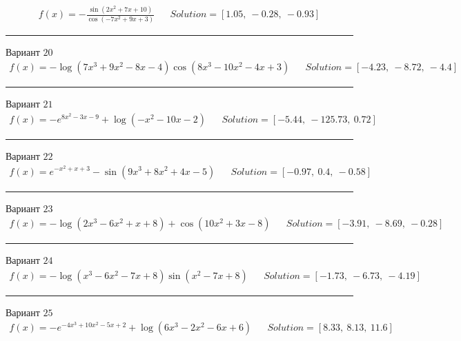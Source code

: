 \documentclass[11pt]{report}
\begin{document}
\begin{align*}
    f(x) = - \frac{\sin{\left(2 x^{2} + 7 x + 10 \right)}}{\cos{\left(- 7 x^{2} + 9 x + 3 \right)}} && Solution = \left[ 1.05, \  -0.28, \  -0.93\right]
\end{align*}
\begin{center}
    \noindent\rule{8cm}{0.4pt}
\end{center}
Вариант \(20\)
\begin{align*}
    f(x) = - \log{\left(7 x^{3} + 9 x^{2} - 8 x - 4 \right)} \cos{\left(8 x^{3} - 10 x^{2} - 4 x + 3 \right)} && Solution = \left[ -4.23, \  -8.72, \  -4.4\right]
\end{align*}
\begin{center}
    \noindent\rule{8cm}{0.4pt}
\end{center}
Вариант \(21\)
\begin{align*}
    f(x) = - e^{8 x^{2} - 3 x - 9} + \log{\left(- x^{2} - 10 x - 2 \right)} && Solution = \left[ -5.44, \  -125.73, \  0.72\right]
\end{align*}
\begin{center}
    \noindent\rule{8cm}{0.4pt}
\end{center}
Вариант \(22\)
\begin{align*}
    f(x) = e^{- x^{2} + x + 3} - \sin{\left(9 x^{3} + 8 x^{2} + 4 x - 5 \right)} && Solution = \left[ -0.97, \  0.4, \  -0.58\right]
\end{align*}
\begin{center}
    \noindent\rule{8cm}{0.4pt}
\end{center}
Вариант \(23\)
\begin{align*}
    f(x) = - \log{\left(2 x^{3} - 6 x^{2} + x + 8 \right)} + \cos{\left(10 x^{2} + 3 x - 8 \right)} && Solution = \left[ -3.91, \  -8.69, \  -0.28\right]
\end{align*}
\begin{center}
    \noindent\rule{8cm}{0.4pt}
\end{center}
Вариант \(24\)
\begin{align*}
    f(x) = - \log{\left(x^{3} - 6 x^{2} - 7 x + 8 \right)} \sin{\left(x^{2} - 7 x + 8 \right)} && Solution = \left[ -1.73, \  -6.73, \  -4.19\right]
\end{align*}
\begin{center}
    \noindent\rule{8cm}{0.4pt}
\end{center}
Вариант \(25\)
\begin{align*}
    f(x) = - e^{- 4 x^{3} + 10 x^{2} - 5 x + 2} + \log{\left(6 x^{3} - 2 x^{2} - 6 x + 6 \right)} && Solution = \left[ 8.33, \  8.13, \  11.6\right]
\end{align*}
\end{document}
